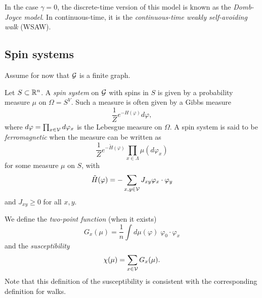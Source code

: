In the case $\gamma = 0$, the discrete-time version of this model is known as
the \emph{Domb-Joyce model}. In continuous-time, it is the \emph{continuous-time
weakly self-avoiding walk} (WSAW).


\subsection{Spin systems}

Assume for now that $\mathcal{G}$ is a finite graph.

Let $S \subset {\mathbb R}^n$. A \emph{spin system} on $\mathcal{G}$ with spins in $S$ is given
by a probability measure $\mu$ on $\Omega = S^V$. Such a measure is often given by a
Gibbs measure
\begin{equation}
\frac{1}{Z} e^{-H(\varphi)} d\varphi,
\end{equation}
where $d\varphi = \prod_{x\in\mathcal{V}} d\varphi_x$ is the Lebesgue measure on
$\Omega$. A spin system is said to be \emph{ferromagnetic} when the measure can
be written as
\begin{equation}
\frac{1}{Z} e^{-\tilde H(\varphi)} \prod_{x\in\Lambda} \mu(d\varphi_x)
\end{equation}
for some measure $\mu$ on $S$, with
\begin{equation}
\tilde H(\varphi) = -\sum_{x, y \in \mathcal{V}} J_{xy} \varphi_x \cdot \varphi_y
\end{equation}
and $J_{xy} \ge 0$ for all $x, y$.


We define the \emph{two-point function} (when it exists)
\begin{equation}
G_x(\mu) = \frac{1}{n} \int d\mu(\varphi) \; \varphi_0 \cdot \varphi_x
\end{equation}
and the \emph{susceptibility}
\begin{equation}
\chi(\mu) = \sum_{x\in\mathcal{V}} G_x(\mu).
\end{equation}
Note that this definition of the susceptibility is consistent with the corresponding
definition for walks.

